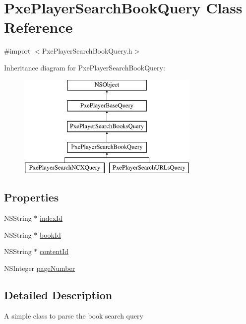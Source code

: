 \hypertarget{interface_pxe_player_search_book_query}{\section{Pxe\-Player\-Search\-Book\-Query Class Reference}
\label{interface_pxe_player_search_book_query}
}


{\ttfamily \#import $<$Pxe\-Player\-Search\-Book\-Query.\-h$>$}

Inheritance diagram for Pxe\-Player\-Search\-Book\-Query\-:\begin{figure}[H]
\begin{center}
\leavevmode
\includegraphics[height=5.000000cm]{interface_pxe_player_search_book_query}
\end{center}
\end{figure}
\subsection*{Properties}
\begin{DoxyCompactItemize}
\item 
N\-S\-String $\ast$ \hyperlink{interface_pxe_player_search_book_query_adb97282496feeeb0ee92b973513bab35}{index\-Id}
\item 
N\-S\-String $\ast$ \hyperlink{interface_pxe_player_search_book_query_af431710f9f3abeb1dd40a615125f8844}{book\-Id}
\item 
N\-S\-String $\ast$ \hyperlink{interface_pxe_player_search_book_query_a060e888d46e8aeb261068cabc92f16bd}{content\-Id}
\item 
N\-S\-Integer \hyperlink{interface_pxe_player_search_book_query_ade43017f3723042bd108214528a50569}{page\-Number}
\end{DoxyCompactItemize}


\subsection{Detailed Description}
A simple class to parse the book search query 

